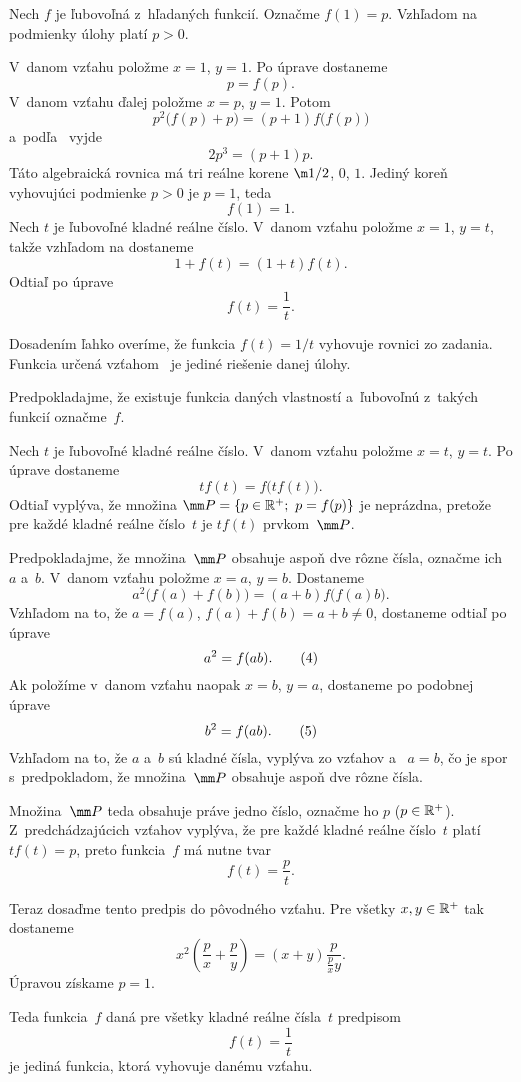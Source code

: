 {%
Nech $f$ je ľubovoľná z~hľadaných funkcií. Označme $f(1)=p$.
Vzhľadom na podmienky úlohy platí $p>0$.

V~danom vzťahu položme $x=1$, $y=1$. Po úprave dostaneme
$$
p=f(p).\tag{1}
$$
V~danom vzťahu ďalej položme $x=p$, $y=1$. Potom
$$
p^2\bigl(f(p)+p\bigr)=(p+1)f\bigl(f(p)\bigr)
$$
a~podľa~ vyjde
$$
2p^3=(p+1)p.
$$
Táto algebraická rovnica má tri reálne korene $\m1/2$, $0$, $1$.
Jediný koreň vyhovujúci podmienke $p>0$ je $p=1$, teda
$$
f(1)=1.              \tag{2}
$$
Nech $t$ je ľubovoľné kladné reálne číslo. V~danom vzťahu
položme $x=1$, $y=t$, takže vzhľadom na  dostaneme
$$
1+f(t)=(1+t)f(t).
$$
Odtiaľ po úprave
$$
f(t)=\frac1t.       \tag{3}
$$

Dosadením ľahko overíme, že funkcia $f(t)=1/t$ vyhovuje
rovnici zo zadania.
Funkcia určená vzťahom~ je jediné riešenie danej úlohy.

\ineriesenie
Predpokladajme, že existuje funkcia daných vlastností
a~ľubovoľnú z~takých funkcií označme~$f$.

Nech $t$ je ľubovoľné kladné reálne číslo. V~danom vzťahu
položme $x=t$, $y=t$. Po úprave dostaneme
$$
t f(t)=f\big(t f(t)\big).
$$
Odtiaľ vyplýva, že množina $\mm P=\{p\in\Bbb R^{+};\ p=f(p)\}$ je neprázdna,
pretože pre každé kladné reálne číslo~$t$ je $tf(t)$ prvkom~$\mm P$.

Predpokladajme, že množina~$\mm P$ obsahuje aspoň dve
rôzne čísla, označme ich $a$ a~$b$. V~danom vzťahu položme
$x=a$, $y=b$. Dostaneme
$$
a^2\big( f(a)+f(b)\big)=(a+b)f\big( f(a)b\big).
$$
Vzhľadom na to, že $a=f(a)$, $f(a)+f(b)=a+b\ne 0$,
dostaneme odtiaľ po úprave
$$
a^2=f(ab).\tag4
$$
Ak položíme v~danom vzťahu naopak $x=b$, $y=a$, dostaneme
po podobnej úprave
$$
b^2=f(a b).\tag5
$$
Vzhľadom na to, že $a$ a~$b$ sú kladné čísla, vyplýva zo vzťahov
 a~ $a=b$, čo je spor s~predpokladom, že množina~$\mm P$
obsahuje aspoň dve rôzne čísla.

Množina~$\mm P$ teda obsahuje práve jedno číslo, označme ho
$p$ ($p\in\Bbb R^{+}$). Z~predchádzajúcich vzťahov vyplýva, že pre každé kladné
reálne číslo~$t$ platí $tf(t)=p$, preto
funkcia~$f$ má nutne tvar
$$
f(t)=\frac{p}t.
$$

Teraz dosaďme tento predpis do pôvodného vzťahu.
Pre všetky $x,y\in\Bbb R^{+}$ tak dostaneme
$$
x^2\left(\frac{p}x+\frac{p}y\right)=(x+y)
  \frac{p}{\frac{p}{x} y}.
$$
Úpravou získame $p=1$.

Teda funkcia~$f$ daná pre všetky kladné reálne čísla~$t$ predpisom
$$
f(t)=\frac1t
$$
je jediná funkcia, ktorá vyhovuje danému vzťahu.}

